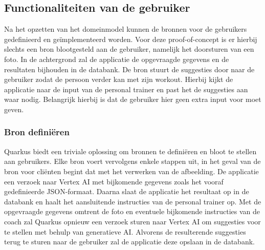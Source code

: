 \subsection{Functionaliteiten van de gebruiker}
\label{subsec:functionaliteiten-van-de-gebruiker}
Na het opzetten van het domeinmodel kunnen de bronnen voor de gebruikers gedefinieerd en geïmplementeerd worden.
Voor deze proof-of-concept is er hierbij slechts een bron blootgesteld aan de gebruiker, namelijk het doorsturen van een foto.
In de achtergrond zal de applicatie de opgevraagde gegevens en de resultaten bijhouden in de databank.
De bron stuurt de suggesties door naar de gebruiker zodat de persoon verder kan met zijn workout.
Hierbij kijkt de applicatie naar de input van de personal trainer en past het de suggesties aan waar nodig.
Belangrijk hierbij is dat de gebruiker hier geen extra input voor moet geven.

\subsubsection{Bron definiëren}
Quarkus biedt een triviale oplossing om bronnen te definiëren en bloot te stellen aan gebruikers.
Elke bron voert vervolgens enkele stappen uit, in het geval van de bron voor cliënten begint dat met het verwerken van de afbeelding.
De applicatie een verzoek naar Vertex AI met bijkomende gegevens zoals het vooraf gedefinieerde JSON-formaat.
Daarna slaat de applicatie het resultaat op in de databank en haalt het aansluitende instructies van de personal trainer op.
Met de opgevraagde gegevens omtrent de foto en eventuele bijkomende instructies van de coach zal Quarkus opnieuw een verzoek sturen naar Vertex AI om suggesties voor te stellen met behulp van generatieve AI.
Alvorens de resulterende suggesties terug te sturen naar de gebruiker zal de applicatie deze opslaan in de databank.

